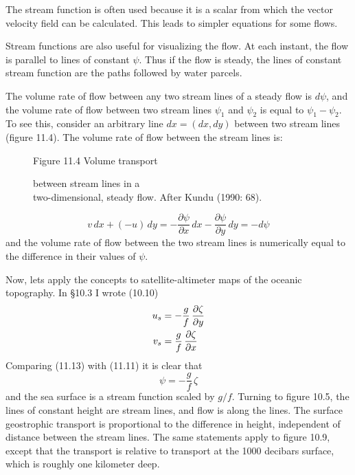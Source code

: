 The stream function is often used because it is a scalar from which the vector
velocity field can be calculated. This leads to simpler equations for some flows.

Stream functions are also useful for visualizing the flow. At each instant, the
flow is parallel to lines of constant $\psi$. Thus if the flow is steady, the
lines of constant stream function are the paths followed by water parcels.

The volume rate of flow between any two stream lines of a steady flow is $d\psi$,
and the volume rate of flow between two stream lines $\psi _1$ and $\psi _2$ is
equal to $\psi _1 - \psi _2$. To see this, consider an arbitrary line $dx =
(dx, dy)$ between two stream lines (figure 11.4). The volume rate of flow
between the stream lines is:

\begin{figure}[t!]
\centering
\footnotesize
Figure 11.4 Volume transport \rule{0mm}{3ex}between stream lines in
a\\two-dimensional, steady flow. After Kundu (1990: 68).

\label{fig:volxportsketch}
\vspace{-4ex}
\end{figure}
\begin{equation}
v\,dx+(-u)\,dy=-\frac{\partial{\psi}}{\partial{x}}\,dx-\frac{\partial{\psi}}{\partial{y}}\,dy=-d\psi
\end{equation}
and the volume rate of flow between the two stream lines is numerically equal to
the difference in their values of $\psi$.

Now, lets apply the concepts to satellite-altimeter maps of the oceanic
topography. In \S 10.3 I wrote (10.10)
\vspace{-1.5ex}
\begin{align}
u_s &= -\frac{g}{f}\,\frac{\partial{\zeta}}{\partial{y}} \notag \\
v_s &= \frac{g}{f}\,\frac{\partial{\zeta}}{\partial{x}}
\end{align}
Comparing (11.13) with (11.11) it is clear that
\begin{equation}
\psi = -\frac{g}{f}\,\zeta
\end{equation}
and the sea surface is a stream function scaled by $g/f$. Turning to figure 10.5,
the lines of constant height are stream lines, and flow is along the lines. The
surface geostrophic transport is
proportional to the difference in height, independent of distance between the stream lines.
The same statements apply to figure 10.9, except that the transport is relative to transport at the 1000 decibars surface, which is roughly one kilometer
deep.

